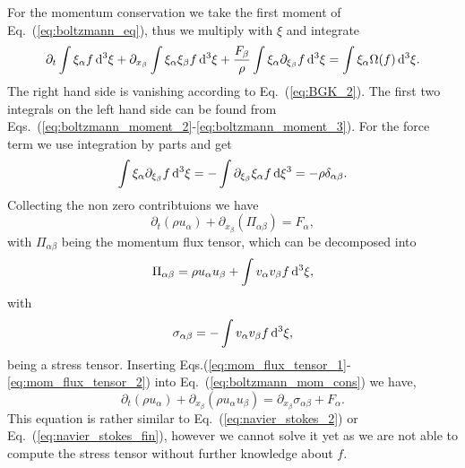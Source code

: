 For the momentum conservation we take the first moment of Eq.~(\ref{eq:boltzmann_eq}), thus we multiply with $\xi$ and integrate
\begin{equation}
    \partial_t\int\xi_{\alpha}f\mathop{}\!\mathrm{d}^3\xi + \partial_{x_{\beta}}\int\xi_{\alpha}\xi_{\beta} f\mathop{}\!\mathrm{d}^3\xi + \frac{F_{\beta}}{\rho}\int\xi_{\alpha}\partial_{\xi_{\beta}}f\mathop{}\!\mathrm{d}^3\xi = \int\xi_{\alpha}\Omega(f)\mathop{}\!\mathrm{d}^3\xi.
\end{equation}
The right hand side is vanishing according to Eq.~(\ref{eq:BGK_2}). 
The first two integrals on the left hand side can be found from Eqs.~(\ref{eq:boltzmann_moment_2}-\ref{eq:boltzmann_moment_3}).
For the force term we use integration by parts and get
\begin{equation}
    \int\xi_{\alpha}\partial_{\xi_{\beta}}f\mathop{}\!\mathrm{d}^3\xi = -\int\partial_{\xi_{\beta}}\xi_{\alpha} f\mathop{}\!\mathrm{d}\xi^3 = -\rho\delta_{\alpha\beta}.
\end{equation}
Collecting the non zero contribtuions we have
\begin{equation}\label{eq:boltzmann_mom_cons}
    \partial_t (\rho u_{\alpha}) + \partial_{x_{\beta}}(\Pi_{\alpha\beta}) = F_{\alpha}, 
\end{equation}
with $\Pi_{\alpha\beta}$ being the momentum flux tensor, which can be decomposed into
\begin{equation}\label{eq:mom_flux_tensor_1}
    \Pi_{\alpha\beta} = \rho u_{\alpha}u_{\beta} +\int v_{\alpha}v_{\beta}f\mathop{}\!\mathrm{d}^3\xi,
\end{equation}
with 
\begin{equation}\label{eq:mom_flux_tensor_2}
    \sigma_{\alpha\beta} = -\int v_{\alpha}v_{\beta}f\mathop{}\!\mathrm{d}^3\xi,
\end{equation}
being a stress tensor.
Inserting Eqs.(\ref{eq:mom_flux_tensor_1}-\ref{eq:mom_flux_tensor_2}) into Eq.~(\ref{eq:boltzmann_mom_cons}) we have,
\begin{equation}\label{eq:mom_boltzmann}
    \partial_t (\rho u_{\alpha}) + \partial_{x_{\beta}}(\rho u_{\alpha}u_{\beta}) = \partial_{x_{\beta}}\sigma_{\alpha\beta} + F_{\alpha}.
\end{equation}
This equation is rather similar to Eq.~(\ref{eq:navier_stokes_2}) or Eq.~(\ref{eq:navier_stokes_fin}), however we cannot solve it yet as we are not able to compute the stress tensor without further knowledge about $f$.

